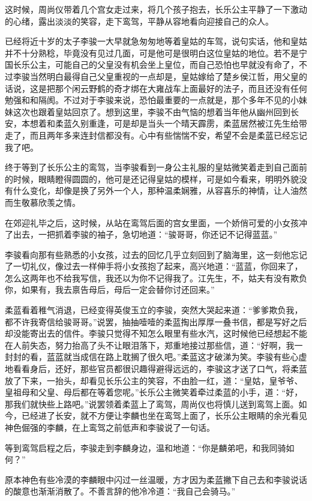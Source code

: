 这时候，周尚仪带着几个宫女走过来，将几个孩子抱去，长乐公主平静了一下激动的心绪，露出淡淡的笑容，走下鸾驾，平静从容地看向迎接自己的众人。

已经将近十岁的太子李骏一大早就急匆匆地等着皇姑的车驾，说句实话，他和皇姑并不十分熟稔，毕竟没有见过几面，可是他可是很明白这位皇姑的地位。若不是宁国长乐公主，可能自己的父皇没有机会坐上皇位，而自己恐怕也早就没有命了，不过李骏当然明白最得自己父皇重视的一点却是，皇姑嫁给了楚乡侯江哲，用父皇的话说，这是把那个闲云野鹤的奇才绑在大雍战车上面最好的法子，而且还没有任何勉强和和隔阂。不过对于李骏来说，恐怕最重要的一点就是，那个多年不见的小妹妹这次也跟着皇姑回京了。想到这里，李骏不由气恼的想着当年他从幽州回到长安，本想着和柔蓝久别重逢，可是却是当头一个晴天霹雳，柔蓝居然被江先生给带走了，而且两年多来连封信都没有。心中有些惴惴不安，希望不会是柔蓝已经忘记我了吧。

终于等到了长乐公主的鸾驾，当李骏看到一身公主礼服的皇姑微笑着走到自己面前的时候，眼睛瞪得圆圆的，他可是还记得皇姑的模样，可是如今看来，明明外貌没有什么变化，却像是换了另外一个人，那种温柔娴雅，从容喜乐的神情，让人油然而生敬慕欣羡之情。

在郊迎礼毕之后，这时候，从站在鸾驾后面的宫女里面，一个娇俏可爱的小女孩冲了出去，一把抓着李骏的袖子，急切地道：“骏哥哥，你还记不记得蓝蓝。”

李骏看向那有些熟悉的小女孩，过去的回忆几乎立刻回到了脑海里，这一刻他忘记了一切礼仪，像过去一样伸手将小女孩抱了起来，高兴地道：“蓝蓝，你回来了，怎么这两年也不给我写信，我还以为你不记得我了。江先生，不，姑夫有没有欺负你，如果有，我去禀告母后，母后一定会替你讨还回来。”

柔蓝看着稚气消退，已经变得英俊玉立的李骏，突然大哭起来道：“爹爹欺负我，都不许我寄信给骏哥哥。”说罢，抽抽噎噎的柔蓝掏出厚厚一叠书信，都是写好之后却没能寄出去的信件。李骏只觉得不知怎么眼里有些水汽，这时候他已经想起不能在人前失态，努力抬高了头不让眼泪落下，郑重地接过那些信，道：“好啊，我一封封的看，蓝蓝就当成信在路上耽搁了很久吧。”柔蓝这才破涕为笑。李骏有些心虚地看看身后，还好，那些官员都很识趣得避得远远的，李骏这才送了口气，将柔蓝放了下来，一抬头，却看见长乐公主的笑容，不由脸一红，道：“皇姑，皇爷爷、皇祖母和父皇、母后都在等着您呢。”长乐公主微笑着牵过柔蓝的小手，道：“好，那我们就快些上路吧。”说罢领着柔蓝上了鸾驾，周尚仪也将慎儿送到鸾驾上面。如今，已经进了长安，就不方便让李麟也坐在鸾驾上面了，长乐公主眼睛的余光看见神色倔强的李麟，在上鸾驾之前低声和李骏说了一句话。

等到鸾驾启程之后，李骏走到李麟身边，温和地道：“你是麟弟吧，和我同骑如何？”

原本神色有些冷漠的李麟眼中闪过一丝温暖，方才因为柔蓝撇下自己去和李骏说话的酸意也渐渐消散了。不善言辞的他冷冷道：“我自己会骑马。”

